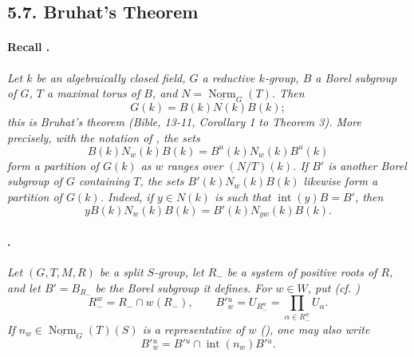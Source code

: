 \subsection*{5.7. Bruhat's Theorem}

\paragraph{Recall .}
\textit{Let \(k\) be an algebraically closed field, \(G\) a
reductive \(k\)-group, \(B\) a Borel subgroup of \(G\), \(T\) a
maximal torus of \(B\), and
\(N=\underline{\operatorname{Norm}}_G(T)\). Then}
\[
  G(k)=B(k)N(k)B(k);
\]
\textit{this is Bruhat's theorem \textup{(\emph{Bible}, 13-11,
Corollary 1 to Theorem 3)}. More precisely, with the notation of
, the sets}
\[
  B(k)N_w(k)B(k)=B^u(k)N_w(k)B^u(k)
\]
\textit{form a partition of \(G(k)\) as \(w\) ranges over
\((N/T)(k)\). If \(B'\) is another Borel subgroup of \(G\)
containing \(T\), the sets \(B'(k)N_w(k)B(k)\) likewise form a
partition of \(G(k)\). Indeed, if \(y\in N(k)\) is such that
\(\operatorname{int}(y)B=B'\), then}
\[
  yB(k)N_w(k)B(k)=B'(k)N_{yw}(k)B(k).
\]

\paragraph{.}
\textit{Let \((G,T,M,R)\) be a split \(S\)-group, let \(R_-\) be a
system of positive roots of \(R\), and let \(B'=B_{R_-}\) be the
Borel subgroup it defines. For \(w\in W\), put
\textup{(cf. )}}
\[
  R_-^w=R_-\cap w(R_-),
  \qquad
  B'{}^u_w=U_{R_-^w}
  =\prod_{\alpha\in R_-^w}U_\alpha.
\]
\textit{If
\(n_w\in\underline{\operatorname{Norm}}_G(T)(S)\) is a
representative of \(w\) \textup{()}, one may also write}
\[
  B'{}^u_w=B'{}^u\cap\operatorname{int}(n_w)B'{}^u.
\]

